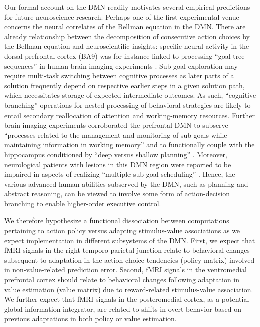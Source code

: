 \documentclass[10pt,letterpaper]{article}
\begin{document}
Our formal account on the DMN readily motivates several empirical predictions for future neuroscience research. Perhaps one of the first experimental venue concerns the neural correlates of the Bellman equation in the DMN. There are already relationship between the decomposition of consecutive action choices by the Bellman equation and neuroscientific insights:
specific neural activity in the dorsal prefrontal cortex (BA9)
was for instance linked to processing ``goal-tree sequences''
in human brain-imaging experiments
\citep{koechlin1999role, koechlin2000dissociating}.
Sub-goal exploration may require multi-task switching
between cognitive processes
as later parts of a solution
frequently depend on respective earlier steps in a given solution path, which
necessitates storage of expected intermediate outcomes.
As such,
``cognitive branching'' operations for nested processing of behavioral strategies
are likely to
entail secondary reallocation of attention and working-memory resources.
Further brain-imaging experiments corroborated
the prefrontal DMN to subserve
``processes related to the management and monitoring of sub-goals while
maintaining information in working memory''
\citep{braver2002role}
and to functionally couple with the hippocampus conditioned by ``deep versus shallow planning''
\citep{kaplan2017neural}.
%
Moreover,
neurological patients with lesions in this DMN region were reported
to be impaired in aspects of realizing ``multiple sub-goal scheduling''
\citep{burgess2000cognitive}.
Hence,
the various advanced human abilities subserved by the DMN, such as
planning and abstract reasoning, can be viewed to involve some form of
action-decision branching to enable higher-order executive control.

We therefore hypothesize a functional dissociation between computations pertaining to action policy versus adapting stimulus-value associations as we expect implementation in different subsystems of the DMN. First, we expect that fMRI signals in the right temporo-parietal junction relate to behavioral changes subsequent to adaptation in the action choice tendencies (policy matrix) involved in non-value-related prediction error. Second, fMRI signals in the ventromedial prefrontal cortex should relate to behavioral changes following adaptation in value estimation (value matrix) due to reward-related stimulus-value association. We further expect that fMRI signals in the posteromedial cortex, as a potential global information integrator, are related to shifts in overt behavior based on previous adaptations in both policy or value estimation.
\end{document}
